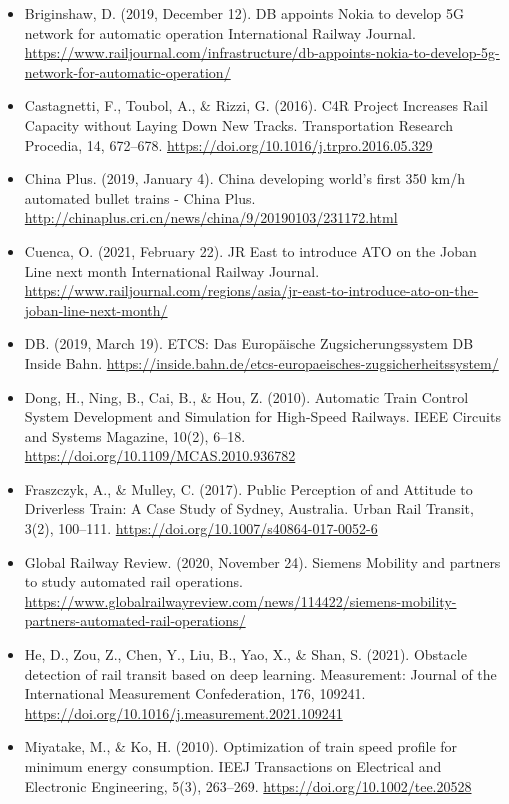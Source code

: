 \documentclass[
]{book}
\providecommand{\tightlist}{%
  \setlength{\itemsep}{0pt}\setlength{\parskip}{0pt}}
\begin{document}
\begin{itemize}
\tightlist
\item
  Briginshaw, D. (2019, December 12). DB appoints Nokia to develop 5G network for automatic operation \textbar{} International Railway Journal. \url{https://www.railjournal.com/infrastructure/db-appoints-nokia-to-develop-5g-network-for-automatic-operation/}
\item
  Castagnetti, F., Toubol, A., \& Rizzi, G. (2016). C4R Project Increases Rail Capacity without Laying Down New Tracks. Transportation Research Procedia, 14, 672--678. \url{https://doi.org/10.1016/j.trpro.2016.05.329}
\item
  China Plus. (2019, January 4). China developing world's first 350 km/h automated bullet trains - China Plus. \url{http://chinaplus.cri.cn/news/china/9/20190103/231172.html}
\item
  Cuenca, O. (2021, February 22). JR East to introduce ATO on the Joban Line next month \textbar{} International Railway Journal. \url{https://www.railjournal.com/regions/asia/jr-east-to-introduce-ato-on-the-joban-line-next-month/}
\item
  DB. (2019, March 19). ETCS: Das Europäische Zugsicherungssystem \textbar{} DB Inside Bahn. \url{https://inside.bahn.de/etcs-europaeisches-zugsicherheitssystem/}
\item
  Dong, H., Ning, B., Cai, B., \& Hou, Z. (2010). Automatic Train Control System Development and Simulation for High-Speed Railways. IEEE Circuits and Systems Magazine, 10(2), 6--18. \url{https://doi.org/10.1109/MCAS.2010.936782}
\item
  Fraszczyk, A., \& Mulley, C. (2017). Public Perception of and Attitude to Driverless Train: A Case Study of Sydney, Australia. Urban Rail Transit, 3(2), 100--111. \url{https://doi.org/10.1007/s40864-017-0052-6}
\item
  Global Railway Review. (2020, November 24). Siemens Mobility and partners to study automated rail operations. \url{https://www.globalrailwayreview.com/news/114422/siemens-mobility-partners-automated-rail-operations/}
\item
  He, D., Zou, Z., Chen, Y., Liu, B., Yao, X., \& Shan, S. (2021). Obstacle detection of rail transit based on deep learning. Measurement: Journal of the International Measurement Confederation, 176, 109241. \url{https://doi.org/10.1016/j.measurement.2021.109241}
\item
  Miyatake, M., \& Ko, H. (2010). Optimization of train speed profile for minimum energy consumption. IEEJ Transactions on Electrical and Electronic Engineering, 5(3), 263--269. \url{https://doi.org/10.1002/tee.20528}

\end{itemize}
\end{document}
